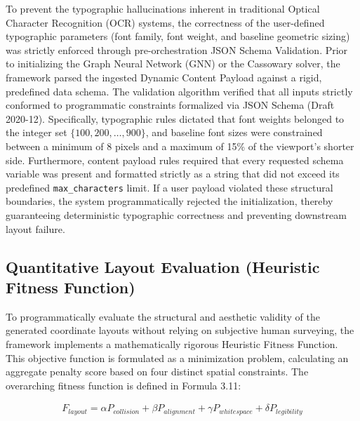\begin{refsection}
To prevent the typographic hallucinations inherent in traditional Optical Character Recognition (OCR) systems, the correctness of the user-defined typographic parameters (font family, font weight, and baseline geometric sizing) was strictly enforced through pre-orchestration JSON Schema Validation. Prior to initializing the Graph Neural Network (GNN) or the Cassowary solver, the framework parsed the ingested Dynamic Content Payload against a rigid, predefined data schema. The validation algorithm verified that all inputs strictly conformed to programmatic constraints formalized via JSON Schema (Draft 2020-12). Specifically, typographic rules dictated that font weights belonged to the integer set $\{100, 200, \dots, 900\}$, and baseline font sizes were constrained between a minimum of 8 pixels and a maximum of 15\% of the viewport's shorter side. Furthermore, content payload rules required that every requested schema variable was present and formatted strictly as a string that did not exceed its predefined \texttt{max\_characters} limit. If a user payload violated these structural boundaries, the system programmatically rejected the initialization, thereby guaranteeing deterministic typographic correctness and preventing downstream layout failure.

\subsection{Quantitative Layout Evaluation (Heuristic Fitness Function)}
To programmatically evaluate the structural and aesthetic validity of the generated coordinate layouts without relying on subjective human surveying, the framework implements a mathematically rigorous Heuristic Fitness Function. This objective function is formulated as a minimization problem, calculating an aggregate penalty score based on four distinct spatial constraints. The overarching fitness function is defined in Formula 3.11:

\begin{center}
\begin{minipage}{0.8\textwidth}
\begin{equation}
\begin{aligned}
F_{layout} = \alpha P_{collision} + \beta P_{alignment} + \gamma P_{whitespace} + \delta P_{legibility}
\end{aligned}
\end{equation}
\centering
\label{formula:heuristic-fitness-function}
\end{minipage}
\end{center}


\end{refsection}
